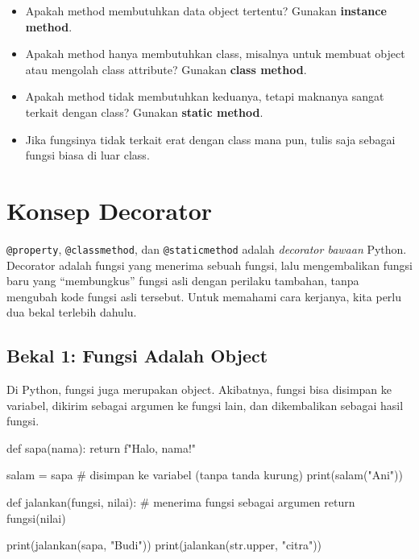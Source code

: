 \begin{tips}
\begin{itemize}
  \item Apakah method membutuhkan data object tertentu? Gunakan \textbf{instance method}.
  \item Apakah method hanya membutuhkan class, misalnya untuk membuat object atau mengolah class attribute? Gunakan \textbf{class method}.
  \item Apakah method tidak membutuhkan keduanya, tetapi maknanya sangat terkait dengan class? Gunakan \textbf{static method}.
  \item Jika fungsinya tidak terkait erat dengan class mana pun, tulis saja sebagai fungsi biasa di luar class.
\end{itemize}
\end{tips}

\section{Konsep Decorator}

\texttt{@property}, \texttt{@classmethod}, dan \texttt{@staticmethod} adalah \emph{decorator bawaan} Python. Decorator adalah fungsi yang menerima sebuah fungsi, lalu mengembalikan fungsi baru yang ``membungkus'' fungsi asli dengan perilaku tambahan, tanpa mengubah kode fungsi asli tersebut. Untuk memahami cara kerjanya, kita perlu dua bekal terlebih dahulu.

\subsection{Bekal 1: Fungsi Adalah Object}

Di Python, fungsi juga merupakan object. Akibatnya, fungsi bisa disimpan ke variabel, dikirim sebagai argumen ke fungsi lain, dan dikembalikan sebagai hasil fungsi.

\begin{kode}
def sapa(nama):
    return f"Halo, {nama}!"

salam = sapa                    # disimpan ke variabel (tanpa tanda kurung)
print(salam("Ani"))

def jalankan(fungsi, nilai):    # menerima fungsi sebagai argumen
    return fungsi(nilai)

print(jalankan(sapa, "Budi"))
print(jalankan(str.upper, "citra"))
\end{kode}

